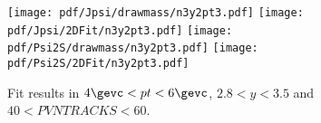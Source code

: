 \begin{figure}[H]
\begin{center}
\texttt{[image: pdf/Jpsi/drawmass/n3y2pt3.pdf]}
\texttt{[image: pdf/Jpsi/2DFit/n3y2pt3.pdf]}
\vspace*{-0.5cm}
\texttt{[image: pdf/Psi2S/drawmass/n3y2pt3.pdf]}
\texttt{[image: pdf/Psi2S/2DFit/n3y2pt3.pdf]}
\vspace*{-0.5cm}
\end{center}
\caption{Fit results in $4\gevc<pt<6\gevc$, $2.8<y<3.5$ and $40<PVNTRACKS<60$.}
\label{Fitn3y2pt3}
\end{figure}
